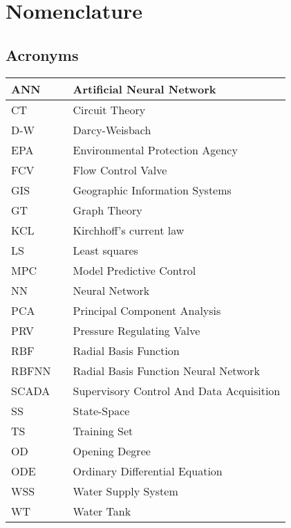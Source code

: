 \chapter{Nomenclature}

\section*{Acronyms}
	
	\begin{tabular}{|l c l|} \hline
		ANN     &&	Artificial Neural Network						\\ \hline
		CT      &&	Circuit Theory									\\ \hline
		D-W     &&	Darcy-Weisbach									\\ \hline
		EPA     &&	Environmental Protection Agency					\\ \hline
		FCV     &&	Flow Control Valve								\\ \hline
		GIS     &&	Geographic Information Systems					\\ \hline
		GT      &&	Graph Theory									\\ \hline
		KCL     &&	Kirchhoff's current law							\\ \hline
		LS      &&	Least squares									\\ \hline
		MPC 	&&	Model Predictive Control						\\ \hline
		NN  	&&	Neural Network									\\ \hline		
		PCA     &&	Principal Component Analysis					\\ \hline
		PRV     &&	Pressure Regulating Valve						\\ \hline
		RBF     &&	Radial Basis Function							\\ \hline
		RBFNN   &&	Radial Basis Function Neural Network			\\ \hline
		SCADA   &&	Supervisory Control And Data Acquisition		\\ \hline
		SS      &&	State-Space										\\ \hline
		TS      &&	Training Set									\\ \hline
		OD		&&	Opening Degree									\\ \hline
		ODE		&&	Ordinary Differential Equation					\\ \hline
		WSS 	&&	Water Supply System								\\ \hline
		WT  	&&	Water Tank										\\ \hline
	\end{tabular}

